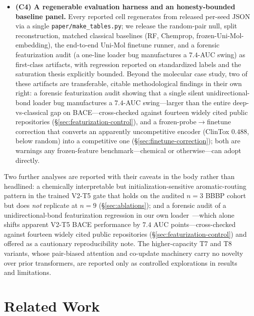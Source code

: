 \documentclass[sigconf,nonacm,anonymous,review]{acmart}
\begin{document}
\begin{itemize}
\item \textbf{(C4) A regenerable evaluation harness and an honesty-bounded baseline panel.} Every reported cell regenerates from released per-seed JSON via a single \texttt{paper/make\_tables.py}; we release the random-pair null, split reconstruction, matched classical baselines (RF, Chemprop, frozen-Uni-Mol-embedding), the end-to-end Uni-Mol finetune runner, and a forensic featurization audit (a one-line loader bug manufactures a $7.4$-AUC swing) as first-class artifacts, with regression reported on standardized labels and the saturation thesis explicitly bounded. Beyond the molecular case study, two of these artifacts are transferable, citable methodological findings in their own right: a forensic featurization audit showing that a single silent unidirectional-bond loader bug manufactures a $7.4$-AUC swing---larger than the entire deep-vs-classical gap on BACE---cross-checked against fourteen widely cited public repositories (\S\ref{sec:featurization-control}), and a frozen-probe$\rightarrow$finetune correction that converts an apparently uncompetitive encoder (ClinTox $0.488$, below random) into a competitive one (\S\ref{sec:finetune-correction}); both are warnings any frozen-feature benchmark---chemical or otherwise---can adopt directly.
\end{itemize}

Two further analyses are reported with their caveats in the body rather than headlined: a chemically interpretable but initialization-sensitive aromatic-routing pattern in the trained V2-T5 gate that holds on the audited $n{=}3$ BBBP cohort but does \emph{not} replicate at $n{=}9$ (\S\ref{sec:ablations}); and a forensic audit of a unidirectional-bond featurization regression in our own loader~\cite{nguyen2021graphdta}---which alone shifts apparent V2-T5 BACE performance by $7.4$ AUC points---cross-checked against fourteen widely cited public repositories (\S\ref{sec:featurization-control}) and offered as a cautionary reproducibility note. The higher-capacity T7 and T8 variants, whose pair-biased attention and co-update machinery carry no novelty over prior transformers, are reported only as controlled explorations in results and limitations.

\section{Related Work}
\label{sec:related}
\end{document}
